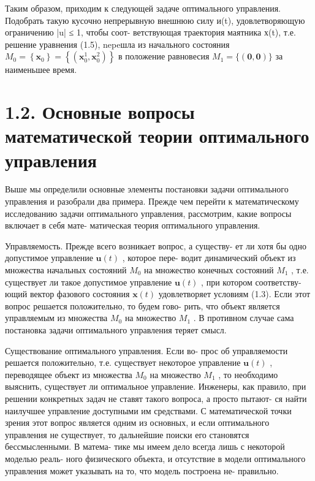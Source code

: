 \documentclass[8pt]{extarticle}
\begin{document}
Таким образом, приходим к следующей задаче оптимального управления. Подобрать такую кусочно непрерывную внешнюю силу и(t), удовлетворяющую ограничению |u| ≤ 1, чтобы соот- ветствующая траектория маятника х(t), т.е. решение уравнения (1.5), nepeшла из начального состояния \({M}_{0} = \left\{  {\mathbf{x}}_{0}\right\}   = \left\{  \left( {{\mathbf{x}}_{0}^{1},{\mathbf{x}}_{0}^{2}}\right) \right\}\) в положение равновесия \({M}_{1} = \{ \left( {\mathbf{0},\mathbf{0}}\right) \}\) за наименьшее время.

\section*{1.2. Основные вопросы математической теории оптимального управления}

Выше мы определили основные элементы постановки задачи оптимального управления и разобрали два примера. Прежде чем перейти к математическому исследованию задачи оптимального управления, рассмотрим, какие вопросы включает в себя мате- матическая теория оптимального управления.

Управляемость. Прежде всего возникает вопрос, а существу- ет ли хотя бы одно допустимое управление \(\mathbf{u}\left( t\right)\) , которое пере- водит динамический объект из множества начальных состояний \({M}_{0}\) на множество конечных состояний \({M}_{1}\) , т.е. существует ли такое допустимое управление \(\mathbf{u}\left( t\right)\) , при котором соответству- ющий вектор фазового состояния \(\mathbf{x}\left( t\right)\) удовлетворяет условиям (1.3). Если этот вопрос решается положительно, то будем гово- рить, что объект является управляемым из множества \({M}_{0}\) на множество \({M}_{1}\) . В противном случае сама постановка задачи оптимального управления теряет смысл.

Существование оптимального управления. Если во- прос об управляемости решается положительно, т.е. существует некоторое управление \(\mathbf{u}\left( t\right)\) , переводящее объект из множества \({M}_{0}\) на множество \({M}_{1}\) , то необходимо выяснить, существует ли оптимальное управление. Инженеры, как правило, при решении конкретных задач не ставят такого вопроса, а просто пытают- ся найти наилучшее управление доступными им средствами. С математической точки зрения этот вопрос является одним из основных, и если оптимального управления не существует, то дальнейшие поиски его становятся бессмысленными. В матема- тике мы имеем дело всегда лишь с некоторой моделью реаль- ного физического объекта, и отсутствие в модели оптимального управления может указывать на то, что модель построена не- правильно.
\end{document}

